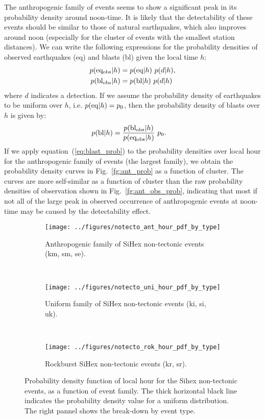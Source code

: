 The anthropogenic family of events seems to show a significant peak in its
probability density around noon-time. It is likely that the detectability of
these events should be similar to those of natural earthquakes, which also
improves around noon (especially for the cluster of events with the smallest
station distances). We can write the following expressions for the probability
densities of observed earthquakes (eq) and blasts (bl) given the local time
$h$:
\begin{align}
p({\rm eq_{obs}}|h) &= p({\rm eq}|h)\ p(d|h),\\
p({\rm bl_{obs}}|h) &= p({\rm bl}|h)\ p(d|h)
\end{align}
where $d$ indicates a detection. If we assume the probability density of
earthquakes to be uniform over $h$, i.e. $p({\rm eq}|h)=p_0$, then the
probability density of blasts over $h$ is given by:
\begin{align}
p({\rm bl}|h) &= \frac{p({\rm bl_{obs}}|h)}{p({\rm eq_{obs}}|h)}\ p_0. \label{eq:blast_prob}
\end{align}
If we apply equation~(\ref{eq:blast_prob}) to the probability densities over
local hour for the anthropogenic family of events (the largest family), we
obtain the probability density curves in Fig.~\ref{fg:ant_prob} as a function
of cluster. The curves are more self-similar as a function of cluster than the
raw probability densities of observation shown in Fig.~\ref{fg:ant_obs_prob},
indicating that most if not all of the large peak in observed occurrence of
anthropogenic events at noon-time may be caused by the detectability effect.

\begin{figure}
\centering
\begin{subfigure}[t]{0.75\textwidth}
	\centering
	\texttt{[image: ../figures/notecto\_ant\_hour\_pdf\_by\_type]}
	\caption{Anthropogenic family of SiHex non-tectonic events (km, sm, se).}
	\label{fg:notecto_hour_ant}
\end{subfigure}
~
\begin{subfigure}[t]{0.75\textwidth}
	\centering
	\texttt{[image: ../figures/notecto\_uni\_hour\_pdf\_by\_type]}
	\caption{Uniform family of SiHex non-tectonic events (ki, si, uk).}
	\label{fg:notecto_hour_uni}
\end{subfigure}
~
\begin{subfigure}[t]{0.75\textwidth}
	\centering
	\texttt{[image: ../figures/notecto\_rok\_hour\_pdf\_by\_type]}
	\caption{Rockburst SiHex non-tectonic events (kr, sr).}
	\label{fg:notecto_hour_rok}
\end{subfigure}
\caption{Probability density function of local hour for the Sihex non-tectonic
events, as a function of event family.  The thick horizontal black line
indicates the probability density value for a uniform distribution.  The right
pannel shows the break-down by event type.}
\label{fg:notecto_hour}
\end{figure}

